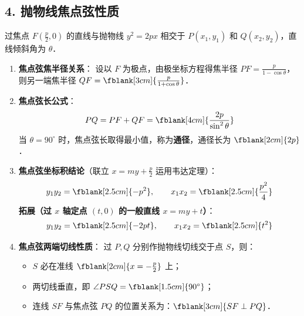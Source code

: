 \documentclass[11pt,a4paper]{ctexart}
\begin{document}
\subsection*{4. 抛物线焦点弦性质}
过焦点 $F(\frac{p}{2},0)$ 的直线与抛物线 $y^2 = 2px$ 相交于 $P(x_1, y_1)$ 和 $Q(x_2, y_2)$，直线倾斜角为 $\theta$．
\begin{enumerate}[label=\arabic*.]
  \item \textbf{焦点弦焦半径关系}：
        设以 $F$ 为极点，由极坐标方程得焦半径 $PF = \frac{p}{1-\cos\theta}$，则另一端焦半径 $QF = \fblank[3cm]{\frac{p}{1+\cos\theta}}$．
  \item \textbf{焦点弦长公式}：
        \[ PQ = PF + QF = \fblank[4cm]{\frac{2p}{\sin^2\theta}} \]
        当 $\theta = 90^\circ$ 时，焦点弦长取得最小值，称为\textbf{通径}，通径长为 $\fblank[2cm]{2p}$．
  \item \textbf{焦点弦坐标积结论}（联立 $x=my+\frac{p}{2}$ 运用韦达定理）：
        \[ y_1y_2 = \fblank[2.5cm]{-p^2},\qquad x_1x_2 = \fblank[2.5cm]{\frac{p^2}{4}} \]
        \textbf{拓展（过 $x$ 轴定点 $(t,0)$ 的一般直线 $x=my+t$）}：
        \[ y_1y_2 = \fblank[2.5cm]{-2pt},\qquad x_1x_2 = \fblank[2.5cm]{t^2} \]
  \item \textbf{焦点弦两端切线性质}：
        过 $P, Q$ 分别作抛物线切线交于点 $S$，则：
        \begin{itemize}[itemsep=0.2em]
          \item $S$ 必在准线 $\fblank[2cm]{x = -\frac{p}{2}}$ 上；
          \item 两切线垂直，即 $\angle PSQ = \fblank[1.5cm]{90^\circ}$；
          \item 连线 $SF$ 与焦点弦 $PQ$ 的位置关系为：$\fblank[3cm]{SF \perp PQ}$．
        \end{itemize}
        \begin{center}
\end{center}
\end{enumerate}
\end{document}
